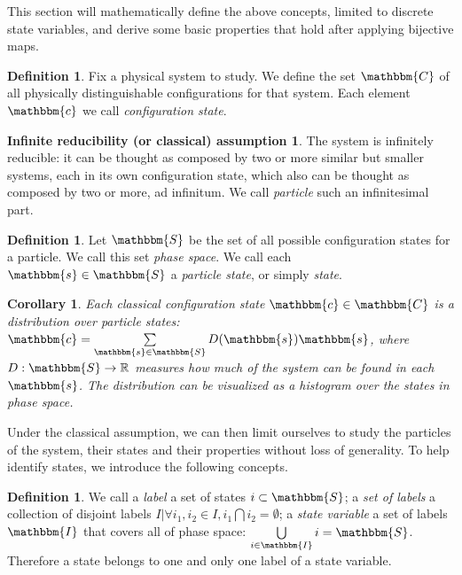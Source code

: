 \documentclass[aps,pra,10pt,twocolumn,floatfix,nofootinbib]{revtex4-1}
\newtheorem{cor}[thm]{Corollary}
\theoremstyle{definition}
\newtheorem{defn}[thm]{Definition}
\newtheorem*{assump1}{Infinite reducibility (or classical) assumption}
\begin{document}
This section will mathematically define the above concepts, limited to discrete state variables, and derive some basic properties that hold after applying bijective maps.

\begin{defn}\label{statedef}
Fix a physical system to study. We define the set $\mathbbm{C}$ of all physically distinguishable configurations for that system. Each element $\mathbbm{c}$ we call \emph{configuration state}.
\end{defn}

\begin{assump1}\label{classical}
The system is infinitely reducible: it can be thought as composed by two or more similar but smaller systems, each in its own configuration state, which also can be thought as composed by two or more, ad infinitum. We call \emph{particle} such an infinitesimal part.
\end{assump1}

\begin{defn}\label{classicalPhaseSpace}
Let $\mathbbm{S}$ be the set of all possible configuration states for a particle. We call this set \emph{phase space}. We call each $\mathbbm{s} \in \mathbbm{S}$ a \emph{particle state}, or simply \emph{state}.
\end{defn}

\begin{cor}\label{classicalDistribution}
Each classical configuration state $\mathbbm{c} \in \mathbbm{C}$ is a distribution over particle states: $\mathbbm{c}=\sum\limits_{\mathbbm{s} \in \mathbbm{S}} D(\mathbbm{s}) \mathbbm{s}$, where $D:\mathbbm{S}\rightarrow\mathbb{R}$ measures how much of the system can be found in each $\mathbbm{s}$. The distribution can be visualized as a histogram over the states in phase space.
\end{cor}

Under the classical assumption, we can then limit ourselves to study the particles of the system, their states and their properties without loss of generality. To help identify states, we introduce the following concepts.

\begin{defn}\label{label}
We call a \emph{label} a set of states $i\subset\mathbbm{S}$; a \emph{set of labels} a collection of disjoint labels $I | \forall i_1,i_2\in I, i_1\bigcap i_2 = \emptyset$; a \emph{state variable} a set of labels $\mathbbm{I}$ that covers all of phase space: $\bigcup\limits_{i \in \mathbbm{I}}i=\mathbbm{S}$. Therefore a state belongs to one and only one label of a state variable.
\end{defn}
\end{document}
